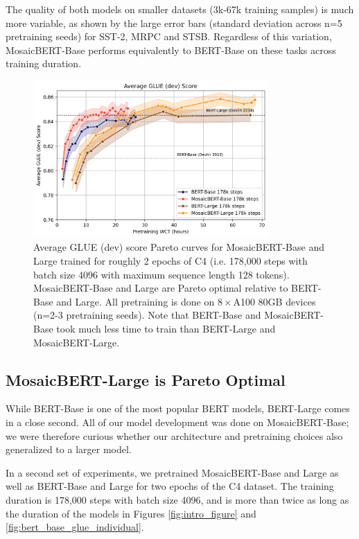 \documentclass{article}
\begin{document}
The quality of both models on smaller datasets (3k-67k training samples) is much more variable, as shown by the large error bars (standard deviation across n=5 pretraining seeds) for SST-2, MRPC and STSB. Regardless of this variation, MosaicBERT-Base performs equivalently to BERT-Base on these tasks across training duration.


\begin{figure}
    \centering
    \includegraphics[width=0.8\textwidth]{figures/bert-large-av-glue-12-28-130pm.png}
    \caption{Average GLUE (dev) score Pareto curves for MosaicBERT-Base and Large trained for roughly 2 epochs of C4 (i.e. 178,000 steps with batch size 4096 with maximum sequence length 128 tokens). MosaicBERT-Base and Large are Pareto optimal relative to BERT-Base and Large. All pretraining is done on $8\times$A100 80GB devices (n=2-3 pretraining seeds). Note that BERT-Base and MosaicBERT-Base took much less time to train than BERT-Large and MosaicBERT-Large.}
    \label{fig:bert_large_glue_av}
\end{figure}

\subsection{MosaicBERT-Large is Pareto Optimal}

While BERT-Base is one of the most popular BERT models, BERT-Large comes in a close second. All of our model development was done on MosaicBERT-Base; we were therefore curious whether our architecture and pretraining choices also generalized to a larger model.

In a second set of experiments, we pretrained MosaicBERT-Base and Large as well as BERT-Base and Large for two epochs of the C4 dataset. The training duration is 178,000 steps with batch size 4096, and is more than twice as long as the duration of the models in Figures \ref{fig:intro_figure} and \ref{fig:bert_base_glue_individual}.
\end{document}
